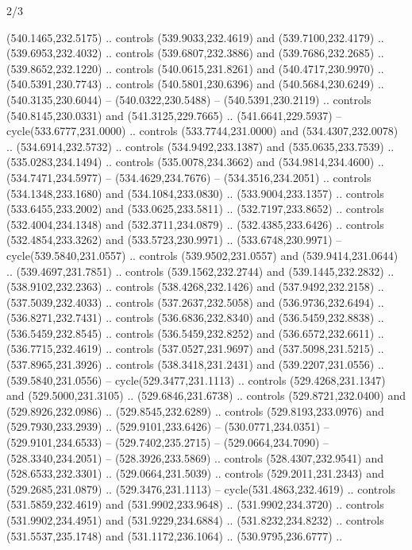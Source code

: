 \begin{flagdescription}{2/3}
\begin{scope}[xshift=0.5\flaglength,yshift=0.5\flagwidth,scale=\flagwidth/495.65]
\begin{scope}[y=0.8pt, x=0.8pt, yscale=-1,shift={(-463.76,-309.78)}]
  (540.1465,232.5175) .. controls (539.9033,232.4619) and (539.7100,232.4179) ..
  (539.6953,232.4032) .. controls (539.6807,232.3886) and (539.7686,232.2685) ..
  (539.8652,232.1220) .. controls (540.0615,231.8261) and (540.4717,230.9970) ..
  (540.5391,230.7743) .. controls (540.5801,230.6396) and (540.5684,230.6249) ..
  (540.3135,230.6044) -- (540.0322,230.5488) -- (540.5391,230.2119) .. controls
  (540.8145,230.0331) and (541.3125,229.7665) .. (541.6641,229.5937) --
  cycle(533.6777,231.0000) .. controls (533.7744,231.0000) and
  (534.4307,232.0078) .. (534.6914,232.5732) .. controls (534.9492,233.1387) and
  (535.0635,233.7539) .. (535.0283,234.1494) .. controls (535.0078,234.3662) and
  (534.9814,234.4600) .. (534.7471,234.5977) -- (534.4629,234.7676) --
  (534.3516,234.2051) .. controls (534.1348,233.1680) and (534.1084,233.0830) ..
  (533.9004,233.1357) .. controls (533.6455,233.2002) and (533.0625,233.5811) ..
  (532.7197,233.8652) .. controls (532.4004,234.1348) and (532.3711,234.0879) ..
  (532.4385,233.6426) .. controls (532.4854,233.3262) and (533.5723,230.9971) ..
  (533.6748,230.9971) -- cycle(539.5840,231.0557) .. controls
  (539.9502,231.0557) and (539.9414,231.0644) .. (539.4697,231.7851) .. controls
  (539.1562,232.2744) and (539.1445,232.2832) .. (538.9102,232.2363) .. controls
  (538.4268,232.1426) and (537.9492,232.2158) .. (537.5039,232.4033) .. controls
  (537.2637,232.5058) and (536.9736,232.6494) .. (536.8271,232.7431) .. controls
  (536.6836,232.8340) and (536.5459,232.8838) .. (536.5459,232.8545) .. controls
  (536.5459,232.8252) and (536.6572,232.6611) .. (536.7715,232.4619) .. controls
  (537.0527,231.9697) and (537.5098,231.5215) .. (537.8965,231.3926) .. controls
  (538.3418,231.2431) and (539.2207,231.0556) .. (539.5840,231.0556) --
  cycle(529.3477,231.1113) .. controls (529.4268,231.1347) and
  (529.5000,231.3105) .. (529.6846,231.6738) .. controls (529.8721,232.0400) and
  (529.8926,232.0986) .. (529.8545,232.6289) .. controls (529.8193,233.0976) and
  (529.7930,233.2939) .. (529.9101,233.6426) -- (530.0771,234.0351) --
  (529.9101,234.6533) -- (529.7402,235.2715) -- (529.0664,234.7090) --
  (528.3340,234.2051) -- (528.3926,233.5869) .. controls (528.4307,232.9541) and
  (528.6533,232.3301) .. (529.0664,231.5039) .. controls (529.2011,231.2343) and
  (529.2685,231.0879) .. (529.3476,231.1113) -- cycle(531.4863,232.4619) ..
  controls (531.5859,232.4619) and (531.9902,233.9648) .. (531.9902,234.3720) ..
  controls (531.9902,234.4951) and (531.9229,234.6884) .. (531.8232,234.8232) ..
  controls (531.5537,235.1748) and (531.1172,236.1064) .. (530.9795,236.6777) ..

\end{scope}
\end{scope}
\end{flagdescription}
